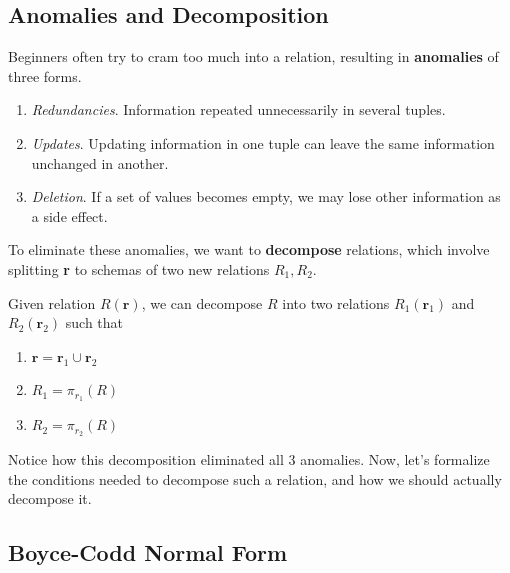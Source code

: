 \documentclass{article}
\begin{document}
  \subsection{Anomalies and Decomposition}

    \begin{definition}[Anomaly]
      Beginners often try to cram too much into a relation, resulting in \textbf{anomalies} of three forms. 
      \begin{enumerate}
        \item \textit{Redundancies}. Information repeated unnecessarily in several tuples. 
        \item \textit{Updates}. Updating information in one tuple can leave the same information unchanged in another. 
        \item \textit{Deletion}. If a set of values becomes empty, we may lose other information as a side effect. 
      \end{enumerate}
    \end{definition}

    To eliminate these anomalies, we want to \textbf{decompose} relations, which involve splitting \textbf{r} to schemas of two new relations $R_1, R_2$. 

    \begin{definition}[Decomposition]
      Given relation $R(\mathbf{r})$, we can decompose $R$ into two relations $R_1 (\mathbf{r}_1)$ and $R_2 (\mathbf{r}_2)$ such that 
      \begin{enumerate}
        \item $\mathbf{r} = \mathbf{r}_1 \cup \mathbf{r}_2$ 
        \item $R_1 = \pi_{r_1} (R)$
        \item $R_2 = \pi_{r_2} (R)$
      \end{enumerate}
    \end{definition}

    \begin{example}
      
    \end{example}

    Notice how this decomposition eliminated all 3 anomalies. Now, let's formalize the conditions needed to decompose such a relation, and how we should actually decompose it. 

  \subsection{Boyce-Codd Normal Form}
\end{document}
